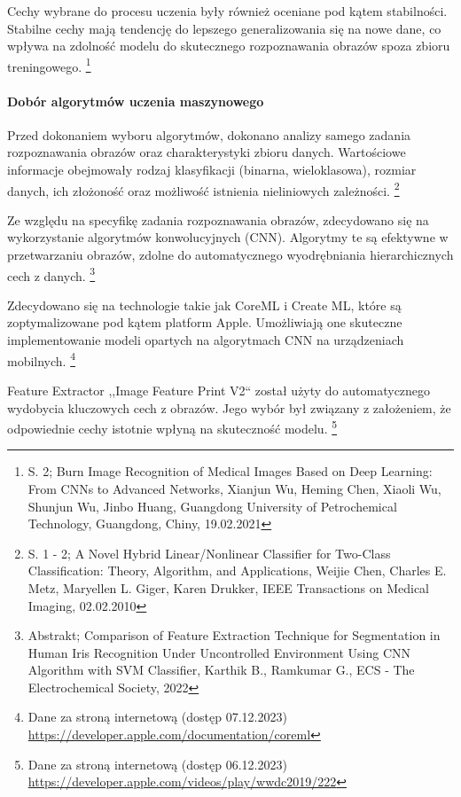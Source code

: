 \documentclass[12pt, a4paper, twoside, openany]{book}
\newcommand{\forceindent}{\leavevmode{\parindent=1.3em\indent}}
\begin{document}
Cechy wybrane do procesu uczenia były również oceniane pod kątem stabilności. Stabilne cechy mają tendencję do lepszego generalizowania się na nowe dane, co wpływa na zdolność modelu do skutecznego rozpoznawania obrazów spoza zbioru treningowego. \footnote{ S. 2; Burn Image Recognition of Medical Images Based on Deep Learning: From CNNs to Advanced Networks, Xianjun Wu, Heming Chen, Xiaoli Wu, Shunjun Wu, Jinbo Huang, Guangdong University of Petrochemical Technology, Guangdong, Chiny, 19.02.2021}

\paragraph{Dobór algorytmów uczenia maszynowego\\}
\forceindent Przed dokonaniem wyboru algorytmów, dokonano analizy samego zadania rozpoznawania obrazów oraz charakterystyki zbioru danych.
Wartościowe informacje obejmowały rodzaj klasyfikacji (binarna, wieloklasowa), rozmiar danych, ich złożoność oraz możliwość istnienia nieliniowych zależności. \footnote{ S. 1 - 2; A Novel Hybrid Linear/Nonlinear Classifier for Two-Class Classification: Theory, Algorithm, and Applications, Weijie Chen, Charles E. Metz, Maryellen L. Giger, Karen Drukker, IEEE Transactions on Medical Imaging, 02.02.2010}

Ze względu na specyfikę zadania rozpoznawania obrazów, zdecydowano się na wykorzystanie algorytmów konwolucyjnych (CNN).
Algorytmy te są efektywne w przetwarzaniu obrazów, zdolne do automatycznego wyodrębniania hierarchicznych cech z danych. \footnote{Abstrakt; Comparison of Feature Extraction Technique for Segmentation in Human Iris Recognition Under Uncontrolled Environment Using CNN Algorithm with SVM Classifier, Karthik B., Ramkumar G., ECS - The Electrochemical Society, 2022}

Zdecydowano się na technologie takie jak CoreML i Create ML, które są zoptymalizowane pod kątem platform Apple.
Umożliwiają one skuteczne implementowanie modeli opartych na algorytmach CNN na urządzeniach mobilnych. \footnote{ Dane za stroną internetową (dostęp 07.12.2023) \url{https://developer.apple.com/documentation/coreml} }

Feature Extractor ,,Image Feature Print V2`` został użyty do automatycznego wydobycia kluczowych cech z obrazów.
Jego wybór był związany z założeniem, że odpowiednie cechy istotnie wpłyną na skuteczność modelu. \footnote{Dane za stroną internetową (dostęp 06.12.2023) \url{https://developer.apple.com/videos/play/wwdc2019/222}}
\end{document}
